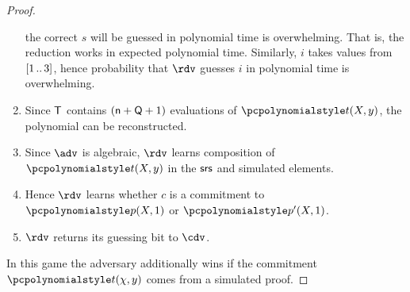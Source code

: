 \documentclass[runningheads,11pt]{llncs}
\begin{document}
\begin{proof}
\begin{enumerate}
    the correct $s$ will be guessed in polynomial time is overwhelming. That is,
    the reduction works in expected polynomial time. Similarly, $i$ takes values
    from $[1 \, .. \, 3]$, hence probability that $\rdv$ guesses $i$ in polynomial
    time is overwhelming. 
  \item Since $\mathsf{T}$ contains $(\mathsf{n} + \mathsf{Q} + 1)$ evaluations of
    $\p{t} (X, y)$, the polynomial can be reconstructed.
  \item Since $\adv$ is algebraic, $\rdv$ learns composition of $\p{t} (X, y)$
    in the $\mathsf{srs}$ and simulated elements.
  \item Hence $\rdv$ learns whether $c$ is a commitment to $\p{p} (X, 1)$ or
    $\p{p'} (X, 1)$.
  \item $\rdv$ returns its guessing bit to $\cdv$.
  \end{enumerate}

   In this game the adversary additionally wins if the commitment
  $\p{t} (\chi, y)$ comes from a simulated proof.


\end{proof}
\end{document}

